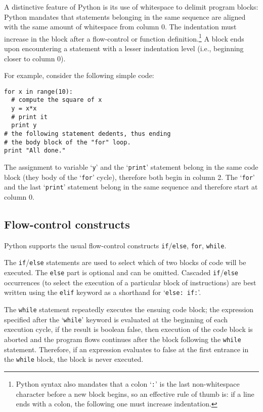 A distinctive feature of Python is its use of whitespace to delimit
program blocks: Python mandates that statements belonging in the same
sequence are aligned with the same amount of whitespace from column 0.
The indentation must increase in the block after a flow-control or
function definition.\footnote{Python syntax also mandates that a colon
  `\lstinline{:}' is the last non-whitespace character before a new
  block begins, so an effective rule of thumb is: if a line ends with
  a colon, the following one must increase indentation.}
A block ends upon encountering a statement with a lesser indentation
level (i.e., beginning closer to column 0).

For example, consider the following simple code:
\begin{lstlisting}
for x in range(10):
  # compute the square of x
  y = x*x
  # print it
  print y
# the following statement dedents, thus ending
# the body block of the "for" loop.
print "All done."
\end{lstlisting}
The assignment to variable `\lstinline{y}' and the `\lstinline{print}'
statement belong in the same code block (they body of the
`\lstinline{for}' cycle), therefore both begin in column 2.  The
`\lstinline{for}' and the last `\lstinline{print}' statement belong in
the same sequence and therefore start at column 0. 
                                                                          
                                                               

\subsection{Flow-control constructs}
\label{sec:flow-control}

Python supports the usual flow-control constructs
\lstinline{if}/\lstinline{else}, \lstinline{for}, \lstinline{while}.

The \lstinline{if}/\lstinline{else} statements are used to select which of two
blocks of code will be executed.  The \lstinline{else} part is optional and
can be omitted.  Cascaded \lstinline{if}/\lstinline{else} occurrences (to
select the execution of a particular block of instructions) are best
written using the \lstinline{elif} keyword as a shorthand for 
`\verb"else: if:"'. 

The \lstinline{while} statement repeatedly executes the ensuing code block;
the expression specified after the `\lstinline{while}' keyword is evaluated
at the beginning of each execution cycle, if the result is boolean
false, then execution of the code block is aborted and the program
flows continues after the block following the \lstinline{while} statement.
Therefore, if an expression evaluates to false at the first entrance
in the \lstinline{while} block, the block is never executed.

